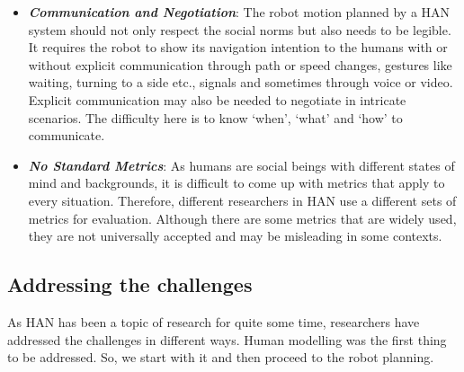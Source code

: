 \begin{itemize}[leftmargin=*]
    \item \textbf{\textit{Communication and Negotiation}}: The robot motion planned by a HAN system should not only respect the social norms but also needs to be legible. It requires the robot to show its navigation intention to the humans with or without explicit communication through path or speed changes, gestures like waiting, turning to a side etc., signals and sometimes through voice or video. Explicit communication may also be needed to negotiate in intricate scenarios. The difficulty here is to know `when', `what' and `how' to communicate.
    \item \textbf{\textit{No Standard Metrics}}: As humans are social beings with different states of mind and backgrounds, it is difficult to come up with metrics that apply to every situation. Therefore, different researchers in HAN use a different sets of metrics for evaluation. Although there are some metrics that are widely used, they are not universally accepted and may be misleading in some contexts.
    
\end{itemize}
\subsection{Addressing the challenges}
As HAN has been a topic of research for quite some time, researchers have addressed the challenges in different ways. Human modelling was the first thing to be addressed. So, we start with it and then proceed to the robot planning.
